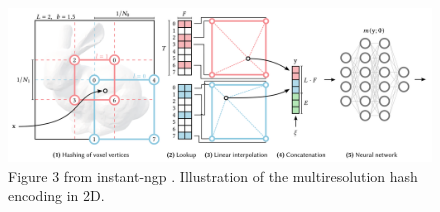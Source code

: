 \begin{figure}[h]
    \centering
    \includegraphics[width=1.0\textwidth]{figures/instant-ngp-hash-encoding.png}
    \caption{Figure 3 from instant-ngp \cite{muller_instant_2022}. Illustration of the multiresolution hash encoding in 2D.}
    \label{fig:instant-ngp-hash-encoding}
\end{figure}